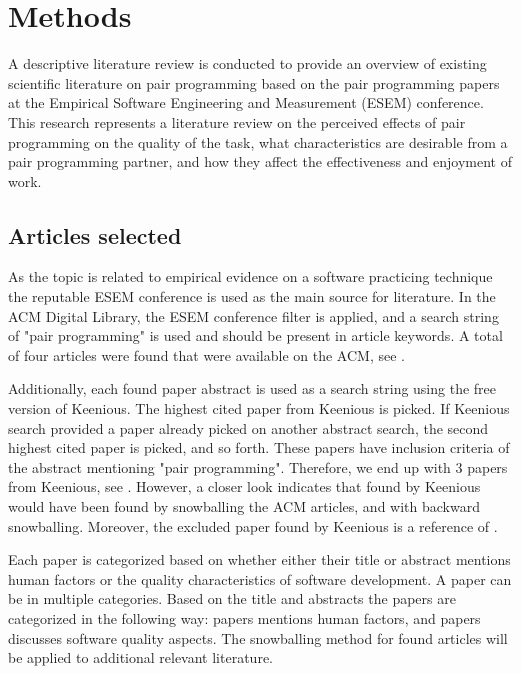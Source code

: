 \documentclass[conference]{IEEEtran}
\begin{document}
\section{Methods}

A descriptive literature review is conducted to provide an overview of existing scientific literature on pair programming based on the pair programming papers at the Empirical Software Engineering and Measurement (ESEM) conference. This research represents a literature review on the perceived effects of pair programming on the quality of the task, what characteristics are desirable from a pair programming partner, and how they affect the effectiveness and enjoyment of work. 

\subsection{Articles selected}

As the topic is related to empirical evidence on a software practicing technique the reputable ESEM conference is used as the main source for literature. In the ACM Digital Library, the ESEM conference filter is applied, and a search string of "pair programming" is used and should be present in article keywords. A total of four articles were found that were available on the ACM, see \cite{10.1145/2652524.2652529, 10.1145/1414004.1414026, 10.1145/1852786.1852816, 10.1145/1159733.1159749}.

Additionally, each found paper abstract is used as a search string using the free version of Keenious. The highest cited paper from Keenious is picked. If Keenious search provided a paper already picked on another abstract search, the second highest cited paper is picked, and so forth. These papers have inclusion criteria of the abstract mentioning "pair programming". Therefore, we end up with 3 papers from Keenious, see \cite{Williams2000Strengthening, Arisholm2007Evaluating, Hannay2009effectiveness}. However, a closer look indicates that \cite{Williams2000Strengthening, Arisholm2007Evaluating} found by Keenious would have been found by snowballing the ACM articles, and \cite{Hannay2009effectiveness} with backward snowballing. Moreover, the excluded paper \cite{ChamorroPremuzic2003Personality} found by Keenious is a reference of \cite{10.1145/1852786.1852816}.

Each paper is categorized based on whether either their title or abstract mentions human factors or the quality characteristics of software development. A paper can be in multiple categories. Based on the title and abstracts the papers are categorized in the following way: papers \cite{10.1145/2652524.2652529, Williams2000Strengthening, 10.1145/1414004.1414026, 10.1145/1852786.1852816} mentions human factors, and papers \cite{Williams2000Strengthening, 10.1145/1414004.1414026, Arisholm2007Evaluating, 10.1145/1159733.1159749, Hannay2009effectiveness} discusses software quality aspects. The snowballing method for found articles will be applied to additional relevant literature.
\end{document}

